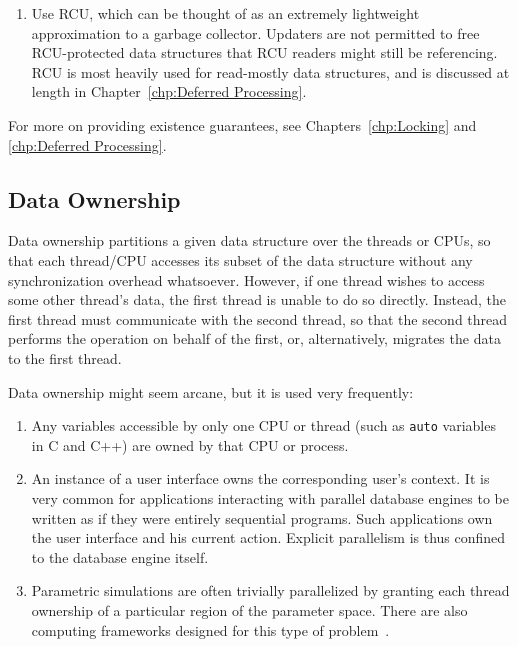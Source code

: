 {\begin{enumerate}
		(TM)~\cite{Herlihy93a,DBLomet1977SIGSOFT,Shavit95},
		so that each reference and
		modification to the data structure in question is
		performed atomically.
		Although TM has engendered much excitement in recent years,
		and seems likely to be of some use in production software,
		developers should exercise some
		caution~\cite{Blundell2005DebunkTM,Blundell2006TMdeadlock,McKenney2007PLOSTM},
		particularly in performance-critical code.
		In particular, existence guarantees require that the
		transaction covers the full path from a global reference
		to the data elements being updated.
	\item	Use RCU, which can be thought of as an extremely lightweight
		approximation to a garbage collector.
		Updaters are not permitted to free RCU-protected
		data structures that RCU readers might still be referencing.
		RCU is most heavily used for read-mostly data structures,
		and is discussed at length in
		Chapter~\ref{chp:Deferred Processing}.
	\end{enumerate}

	For more on providing existence guarantees, see
	Chapters~\ref{chp:Locking} and \ref{chp:Deferred Processing}.
}\QuickQuizEnd

\subsection{Data Ownership}
\label{sec:SMPdesign:Data Ownership}

Data ownership partitions a given data structure over the threads
or CPUs, so that each thread/CPU accesses its subset of the data
structure without any synchronization overhead whatsoever.
However, if one thread wishes to access some other thread's data,
the first thread is unable to do so directly.
Instead, the first thread must communicate with the second thread,
so that the second thread performs the operation on behalf of the
first, or, alternatively, migrates the data to the first thread.

Data ownership might seem arcane, but it is used very frequently:
\begin{enumerate}
\item	Any variables accessible by only one CPU or thread
	(such as {\tt auto} variables in C
	and C++) are owned by that CPU or process.
\item	An instance of a user interface owns the corresponding
	user's context.  It is very common for applications
	interacting with parallel database engines to be
	written as if they were entirely sequential programs.
	Such applications own the user interface and his current
	action.  Explicit parallelism is thus confined to the
	database engine itself.
\item	Parametric simulations are often trivially parallelized
	by granting each thread ownership of a particular region
	of the parameter space.
	There are also computing frameworks designed for this
	type of problem~\cite{BOINC2008}.
\end{enumerate}


